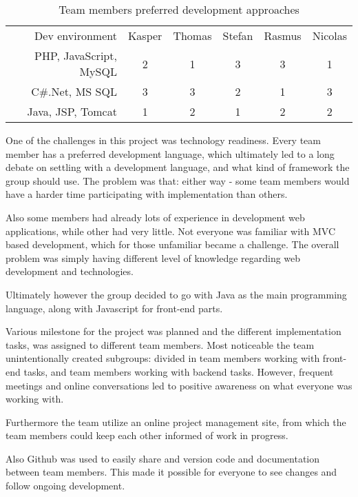 \begin{table}[h]
\caption{Team members preferred development approaches}\label{tbl:dev_environment}
    \begin{tabular}{rccccc}
    Dev environment        & Kasper & Thomas & Stefan & Rasmus & Nicolas \\
    PHP, JavaScript, MySQL & 2      & 1      & 3      & 3      & 1       \\
    C\#.Net, MS SQL         & 3      & 3      & 2      & 1      & 3       \\
    Java, JSP, Tomcat      & 1      & 2      & 1      & 2      & 2       \\
    \end{tabular}
\end{table}

One of the challenges in this project was technology readiness. Every team member has a preferred development language, which ultimately led to a long debate on settling with a development language, and what kind of framework the group should use.
The problem was that: either way - some team members would have a harder time participating with implementation than others.

Also some members had already lots of experience in development web applications, while other had very little. Not everyone was familiar with MVC based development, which for those unfamiliar became a challenge. The overall problem was simply having different level of knowledge regarding web development and technologies.

Ultimately however the group decided to go with Java as the main programming language, along with Javascript for front-end parts.

Various milestone for the project was planned and the different implementation tasks, was assigned to different team members. Most noticeable the team unintentionally created subgroups: divided in team members working with front-end tasks, and team members working with backend tasks.
However, frequent meetings and online conversations led to positive awareness on what everyone was working with.

Furthermore the team utilize an online project management site, from which the team members could keep each other informed of work in progress.

Also Github was used to easily share and version code and documentation between team members. This made it possible for everyone to see changes and follow ongoing development.
